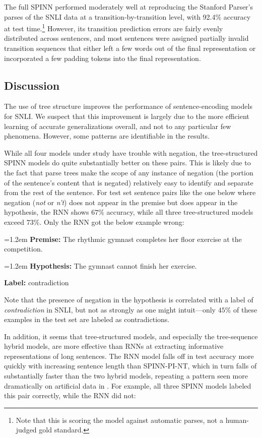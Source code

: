 \documentclass[11pt]{article}
\newcommand{\word}[1]{\emph{#1}}
\newcommand{\snli}[3]{{\vspace{0.25em}
{\small \setlength{\parindent}{0.6em} \hangindent=1.2em  \textbf{Premise:} #1\par}\vspace{0.25em}
{\small \setlength{\parindent}{0.6em} \hangindent=1.2em   \textbf{Hypothesis:} #2\par}\vspace{0.25em}
{\small \setlength{\parindent}{0.6em}  \textbf{Label:} #3\par}
}}
\begin{document}
The full SPINN performed moderately well at reproducing the Stanford Parser's parses of the SNLI data at a transition-by-transition level, with 92.4\% accuracy at test time.\footnote
  {Note that this is scoring the model against automatic parses, not a human-judged gold standard.}
However, its transition prediction errors are fairly evenly distributed across sentences, and most sentences were assigned partially invalid transition sequences that either left a few words out of the final representation or incorporated a few padding tokens into the final representation.

\subsection{Discussion}

The use of tree structure improves the performance of sentence-encoding models for SNLI. We suspect that this improvement is largely due to the more efficient learning of accurate generalizations overall, and not to any particular few phenomena. However, some patterns are identifiable in the results. 

While all four models under study have trouble with negation, the tree-structured SPINN models do quite substantially better on these pairs. This is likely due to the fact that parse trees make the scope of any instance of negation (the portion of the sentence's content that is negated) relatively easy to identify and separate from the rest of the sentence. For test set sentence pairs like the one below where negation (\word{not} or \word{n't}) does not appear in the premise but does appear in the hypothesis, the RNN shows $67\%$ accuracy, while all three tree-structured models exceed $73\%$. Only the RNN got the below example wrong:

\snli
{The rhythmic gymnast completes her floor exercise at the competition.}
{The gymnast cannot finish her exercise.}
{contradiction}
\noindent Note that the presence of negation in the hypothesis is correlated with a label of \textit{contradiction} in SNLI, but not as strongly as one might intuit---only $45\%$ of these examples in the test set are labeled as contradictions.

In addition, it seems that tree-structured models, and especially the tree-sequence hybrid models, are more effective than RNNs at extracting informative representations of long sentences. The RNN model falls off in test accuracy more quickly with increasing sentence length than SPINN-PI-NT, which in turn falls of substantially faster than the two hybrid models, repeating a pattern seen more dramatically on artificial data in \citet{bowman2015trees}. For example, all three SPINN models labeled this pair correctly, while the RNN did not:
\end{document}
